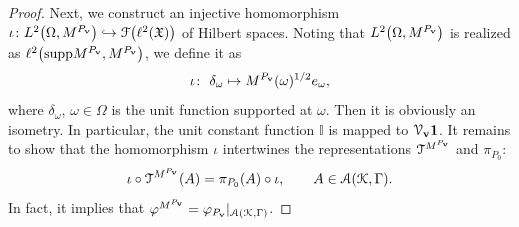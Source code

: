 \documentclass[pdftex]{sigma}
\numberwithin{equation}{section}
\newcommand{\mfrak}[1]{\mathfrak{#1}}
\newcommand{\mcal}[1]{\mathcal{#1}}
\newcommand{\mbb}[1]{\mathbb{#1}}
\newcommand{\mrm}[1]{\mathrm{#1}}
\begin{document}
\begin{proof}
Next, we construct an injective homomorphism $\iota\colon L^{2}\big(\Omega, M^{P_{{\bf v}}}\big)\hookrightarrow \mcal{F}\big(\ell^{2}(\mfrak{X})\big)$ of Hilbert spaces. Noting that $L^{2}\big(\Omega, M^{P_{{\bf v}}}\big)$ is realized as $ \ell^{2}\big(\mrm{supp}M^{P_{{\bf v}}}, M^{P_{{\bf v}}}\big)$, we define it as
\begin{equation*}
	\iota\colon \ \delta_{\omega}\mapsto M^{P_{{\bf v}}}(\omega)^{1/2}e_{\omega},
\end{equation*}
where $\delta_{\omega}$, $\omega\in\Omega$ is the unit function supported at $\omega$. Then it is obviously an isometry. In particular, the unit constant function $\mbb{I}$ is mapped to $\mcal{V}_{{\bf v}}\bm{1}$. It remains to show that the homomorphism $\iota$ intertwines the representations $\mcal{T}^{M^{P_{{\bf v}}}}$ and $\pi_{P_{0}}$:
\begin{equation*}
	\iota\circ \mcal{T}^{M^{P_{{\bf v}}}}(A)= \pi_{P_{0}}(A)\circ \iota,\qquad A\in \mcal{A}(\mcal{K},\Gamma).
\end{equation*}
In fact, it implies that $\varphi^{M^{P_{{\bf v}}}}=\varphi_{P_{{\bf v}}}|_{\mcal{A}(\mcal{K},\Gamma)}$.


\end{proof}
\end{document}
